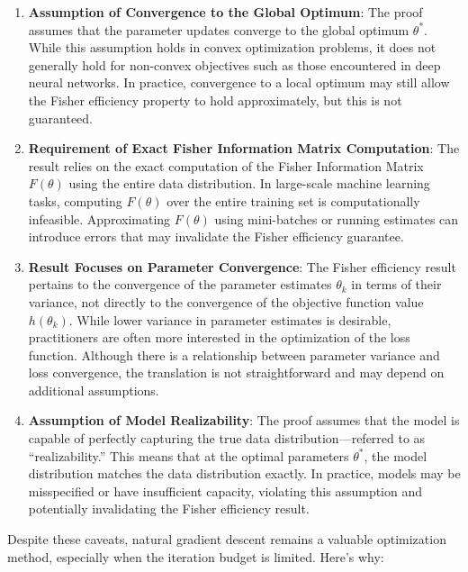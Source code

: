 \begin{enumerate}
    \item \textbf{Assumption of Convergence to the Global Optimum}: The proof assumes that the parameter updates converge to the global optimum \( \theta^* \). While this assumption holds in convex optimization problems, it does not generally hold for non-convex objectives such as those encountered in deep neural networks. In practice, convergence to a local optimum may still allow the Fisher efficiency property to hold approximately, but this is not guaranteed.

    \item \textbf{Requirement of Exact Fisher Information Matrix Computation}: The result relies on the exact computation of the Fisher Information Matrix \( F(\theta) \) using the entire data distribution. In large-scale machine learning tasks, computing \( F(\theta) \) over the entire training set is computationally infeasible. Approximating \( F(\theta) \) using mini-batches or running estimates can introduce errors that may invalidate the Fisher efficiency guarantee.

    \item \textbf{Result Focuses on Parameter Convergence}: The Fisher efficiency result pertains to the convergence of the parameter estimates \( \theta_k \) in terms of their variance, not directly to the convergence of the objective function value \( h(\theta_k) \). While lower variance in parameter estimates is desirable, practitioners are often more interested in the optimization of the loss function. Although there is a relationship between parameter variance and loss convergence, the translation is not straightforward and may depend on additional assumptions.

    \item \textbf{Assumption of Model Realizability}: The proof assumes that the model is capable of perfectly capturing the true data distribution—referred to as ``realizability.'' This means that at the optimal parameters \( \theta^* \), the model distribution matches the data distribution exactly. In practice, models may be misspecified or have insufficient capacity, violating this assumption and potentially invalidating the Fisher efficiency result.
\end{enumerate}

Despite these caveats, natural gradient descent remains a valuable optimization method, especially when the iteration budget is limited. Here's why:

